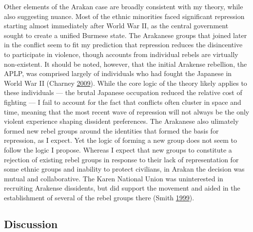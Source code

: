 \documentclass[12pt,]{book}
\theoremstyle{definition}
\theoremstyle{definition}
\theoremstyle{remark}
\begin{document}
Other elements of the Arakan case are broadly consistent with my theory,
while also suggesting nuance. Most of the ethnic minorities faced
significant repression starting almost immediately after World War II,
as the central government sought to create a unified Burmese state. The
Arakanese groups that joined later in the conflict seem to fit my
prediction that repression reduces the disincentive to participate in
violence, though accounts from individual rebels are virtually
non-existent. It should be noted, however, that the initial Arakense
rebellion, the APLP, was comprised largely of individuals who had fought
the Japanese in World War II (Charney
\protect\hyperlink{ref-Charney2009}{2009}). While the core logic of the
theory likely applies to these individuals --- the brutal Japanese
occupation reduced the relative cost of fighting --- I fail to account
for the fact that conflicts often cluster in space and time, meaning
that the most recent wave of repression will not always be the only
violent experience shaping dissident preferences. The Arakanese also
ulimately formed new rebel groups around the identities that formed the
basis for repression, as I expect. Yet the logic of forming a new group
does not seem to follow the logic I propose. Whereas I expect that new
groups to constitute a rejection of existing rebel groups in response to
their lack of representation for some ethnic groups and inability to
protect civilians, in Arakan the decision was mutual and collaborative.
The Karen National Union was uninterested in recruiting Arakense
dissidents, but did support the movement and aided in the establishment
of several of the rebel groups there (Smith
\protect\hyperlink{ref-Smith1999}{1999}).

\subsection{Discussion}\label{discussion}
\end{document}
